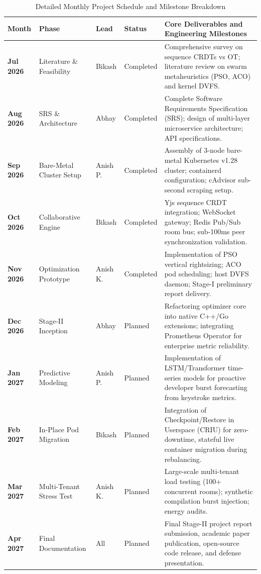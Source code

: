 \documentclass[12pt,a4paper]{report}
\begin{document}
	\begin{table}[htbp]
		\centering
		\scriptsize
		\caption{Detailed Monthly Project Schedule and Milestone Breakdown}
		\label{tab:detailed_schedule}
		\begin{tabularx}{\linewidth}{@{}llllX@{}}
			\toprule
			\textbf{Month} & \textbf{Phase} & \textbf{Lead} & \textbf{Status} & \textbf{Core Deliverables and Engineering Milestones} \\ \midrule
			\textbf{Jul 2026} & Literature \& Feasibility & Bikash & Completed & Comprehensive survey on sequence CRDTs vs OT; literature review on swarm metaheuristics (PSO, ACO) and kernel DVFS. \\
			\textbf{Aug 2026} & SRS \& Architecture & Abhay & Completed & Complete Software Requirements Specification (SRS); design of multi-layer microservice architecture; API specifications. \\
			\textbf{Sep 2026} & Bare-Metal Cluster Setup & Anish P. & Completed & Assembly of 3-node bare-metal Kubernetes v1.28 cluster; containerd configuration; cAdvisor sub-second scraping setup. \\
			\textbf{Oct 2026} & Collaborative Engine & Bikash & Completed & Yjs sequence CRDT integration; WebSocket gateway; Redis Pub/Sub room bus; sub-100ms peer synchronization validation. \\
			\textbf{Nov 2026} & Optimization Prototype & Anish K. & Completed & Implementation of PSO vertical rightsizing; ACO pod scheduling; host DVFS daemon; Stage-I preliminary report delivery. \\ \midrule
			\textbf{Dec 2026} & Stage-II Inception & Abhay & Planned & Refactoring optimizer core into native C++/Go extensions; integrating Prometheus Operator for enterprise metric reliability. \\
			\textbf{Jan 2027} & Predictive Modeling & Anish P. & Planned & Implementation of LSTM/Transformer time-series models for proactive developer burst forecasting from keystroke metrics. \\
			\textbf{Feb 2027} & In-Place Pod Migration & Bikash & Planned & Integration of Checkpoint/Restore in Userspace (CRIU) for zero-downtime, stateful live container migration during rebalancing. \\
			\textbf{Mar 2027} & Multi-Tenant Stress Test & Anish K. & Planned & Large-scale multi-tenant load testing (100+ concurrent rooms); synthetic compilation burst injection; energy audits. \\
			\textbf{Apr 2027} & Final Documentation & All & Planned & Final Stage-II project report submission, academic paper publication, open-source code release, and defense presentation. \\ \bottomrule
		\end{tabularx}
	\end{table}
	
\end{document}
